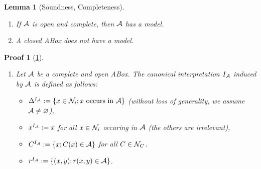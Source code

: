 \documentclass[openany]{scrbook}
\theoremstyle{break}
\newtheorem{Lemma}[Theorem]{Lemma}
\theoremstyle{nonumberbreak}
\theoremstyle{nonumberplain}
\theoremstyle{nonumberbreak}
\newtheorem{Proof}{Proof}
\newcommand{\set}[1]{\left\{#1\right\}}
\begin{document}
\begin{Lemma}[Soundness, Completeness]
  \label{4.2}
  \begin{enumerate}
  \item If ${\cal A}$ is open and complete, then ${\cal A}$ has a model.
  \item A closed ABox does not have a model.
  \end{enumerate}
\end{Lemma}

\begin{Proof}[\cref{4.2}]
  \begin{enumerate}
  \item Let ${\cal A}$ be a complete and open ABox. The canonical
    interpretation $I_{\cal A}$ induced by ${\cal A}$ is defined as
    follows:
    \begin{itemize}
    \item $\Delta^{I_{\cal A}} := \set{x \in {\cal N}_i; x\
        \text{occurs in}\ {\cal A}}$ (without loss of generality, we
      assume ${\cal A} \ne \varnothing$),
    \item $x^{I_{\cal A}} := x$ for all $x \in {\cal N}_i$ occuring in
      ${\cal A}$ (the others are irrelevant),
    \item $C^{I_{\cal A}} := \set{x; C(x) \in {\cal A}}$ for all $C
      \in {\cal N}_C$.
    \item $r^{I_{\cal A}} := \set{(x, y); r(x, y) \in {\cal A}}$.
    \end{itemize}


\end{enumerate}
\end{Proof}
\end{document}
